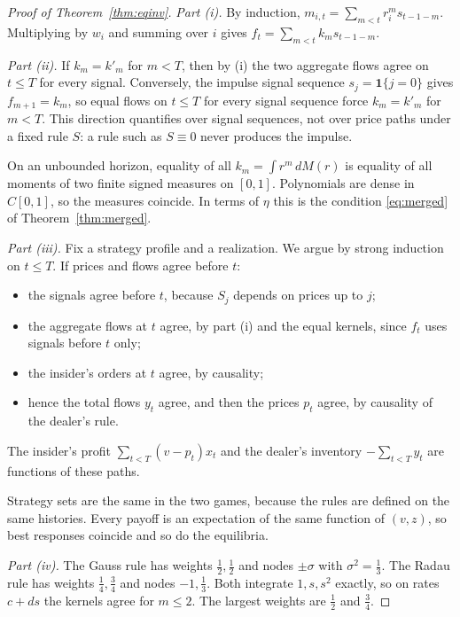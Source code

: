 \documentclass[12pt]{article}
\theoremstyle{definition}
\theoremstyle{remark}
\begin{document}
\begin{proof}[Proof of Theorem~\ref{thm:eqinv}]
\emph{Part (i).} By induction, $m_{i,t}=\sum_{m<t}r_i^m s_{t-1-m}$. Multiplying by $w_i$ and summing over $i$ gives $f_t=\sum_{m<t}k_ms_{t-1-m}$.

\emph{Part (ii).} If $k_m=k'_m$ for $m<T$, then by (i) the two aggregate flows agree on $t\le T$ for every signal. Conversely, the impulse signal sequence $s_j=\mathbf 1\{j=0\}$ gives $f_{m+1}=k_m$, so equal flows on $t\le T$ for every signal sequence force $k_m=k'_m$ for $m<T$. This direction quantifies over signal sequences, not over price paths under a fixed rule $S$: a rule such as $S\equiv0$ never produces the impulse.

On an unbounded horizon, equality of all $k_m=\int r^m\,dM(r)$ is equality of all moments of two finite signed measures on $[0,1]$. Polynomials are dense in $C[0,1]$, so the measures coincide. In terms of $\eta$ this is the condition \eqref{eq:merged} of Theorem~\ref{thm:merged}.

\emph{Part (iii).} Fix a strategy profile and a realization. We argue by strong induction on $t\le T$. If prices and flows agree before $t$:
\begin{itemize}[itemsep=1pt,topsep=2pt]
\item the signals agree before $t$, because $S_j$ depends on prices up to $j$;
\item the aggregate flows at $t$ agree, by part (i) and the equal kernels, since $f_t$ uses signals before $t$ only;
\item the insider's orders at $t$ agree, by causality;
\item hence the total flows $y_t$ agree, and then the prices $p_t$ agree, by causality of the dealer's rule.
\end{itemize}
The insider's profit $\sum_{t<T}(v-p_t)x_t$ and the dealer's inventory $-\sum_{t<T}y_t$ are functions of these paths.

Strategy sets are the same in the two games, because the rules are defined on the same histories. Every payoff is an expectation of the same function of $(v,z)$, so best responses coincide and so do the equilibria.

\emph{Part (iv).} The Gauss rule has weights $\tfrac12,\tfrac12$ and nodes $\pm\sigma$ with $\sigma^2=\tfrac13$. The Radau rule has weights $\tfrac14,\tfrac34$ and nodes $-1,\tfrac13$. Both integrate $1,s,s^2$ exactly, so on rates $c+ds$ the kernels agree for $m\le2$. The largest weights are $\tfrac12$ and $\tfrac34$.
\end{proof}
\end{document}
